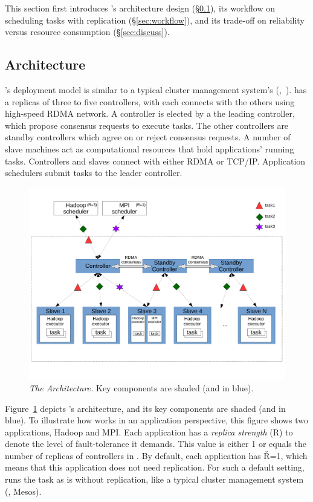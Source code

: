 This section first introduces \xxx's architecture design (\S\ref{sec:arch}), 
its workflow on scheduling tasks with replication (\S\ref{sec:workflow}), and 
its trade-off on reliability versus resource consumption (\S\ref{sec:discuss}).


\subsection{Architecture} \label{sec:arch}

\xxx's deployment model is similar to a typical cluster management system's 
(\eg,~\cite{borg:eurosys15,mesos:nsdi11}). \xxx has a replicas of three to five 
controllers, with each connects with the others using high-speed RDMA network. A 
controller is elected by \paxos a the leading controller, which propose 
consensus requests to execute tasks. The other controllers are standby 
controllers which agree on or reject consensus requests. A number of slave 
machines act as computational resources that hold applications' running tasks. 
Controllers and slaves connect with either RDMA or TCP/IP. Application 
schedulers submit tasks to the leader controller.

\begin{figure}[t]
\vspace{.20in}
\centering
\includegraphics[width=.47\textwidth]{figures/arch}
\vspace{.06in}
\caption{{\em The \xxx Architecture.} Key components are shaded (and 
in blue).} \label{fig:arch}
\vspace{-.05in}
\end{figure}

Figure~\ref{fig:arch} depicts \xxx's architecture, and its key components are 
shaded (and in blue). To illustrate how \xxx works in an application 
perspective, this figure shows two applications, Hadoop and MPI. Each 
application has a \emph{replica strength} (R) to denote the level of 
fault-tolerance it demands. This value is either 1 or equals the number of 
replicas of controllers in \xxx. By default, each application has \v{R=1}, 
which means that this application does not need replication. For such a default 
setting, \xxx runs the task as is without replication, like a typical cluster 
management system (\eg, Mesos).

